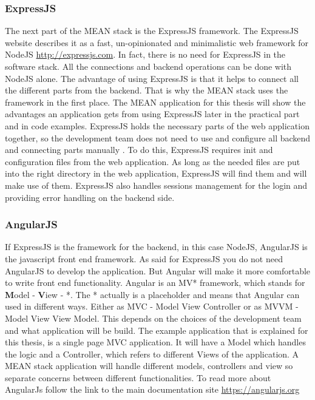 \subsubsection{ExpressJS}
The next part of the MEAN stack is the ExpressJS framework. The ExpressJS website describes it as a fast, un-opinionated and minimalistic web framework
for NodeJS \url{http://expressjs.com}. In fact, there is no need for ExpressJS in the software stack. All the connections and backend operations can be done
with NodeJS alone. The advantage of using ExpressJS is that it helps to connect all the different parts from the backend. That is why the MEAN stack uses the
framework in the first place. The MEAN application for this thesis will show the advantages an application gets from using ExpressJS later in the practical part
and in code examples. ExpressJS holds the necessary parts of the web application together, so the development team does not need to use and configure all backend
and connecting parts manually \cite{brown2014web}. To do this, ExpressJS requires init and configuration files from the web application. As long as
the needed files are put into the right directory in the web application, ExpressJS will find them and will make use of them. ExpressJS also handles sessions management
for the login and providing error handling on the backend side.

\subsubsection{AngularJS}
If ExpressJS is the framework for the backend, in this case NodeJS, AngularJS is the javascript front end framework. As said for ExpressJS you do not need
AngularJS to develop the application. But Angular will make it more comfortable to write front end functionality. Angular is an MV* framework, which stands
for \textbf{M}odel - \textbf{V}iew - *. The * actually is a placeholder and means that Angular can used in different ways. Either as MVC - Model View Controller
or as MVVM - Model View View Model. This depends on the choices of the development team and what application will be build. The example application that is
explained for this thesis, is a single page MVC application. It will have a Model which handles the logic and a Controller, which refers to different Views of
the application. A MEAN stack application will handle different models, controllers and view so separate concerns between different functionalities.
To read more about AngularJs follow the link to the main documentation site \url{https://angularjs.org}

